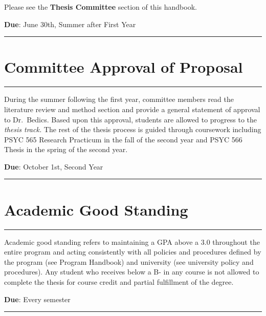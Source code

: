 \documentclass[openany]{book}
\begin{document}
Please see the \textbf{Thesis Committee} section of this handbook.

\textbf{Due}: June 30th, Summer after First Year

\begin{center}\rule{0.5\linewidth}{0.5pt}\end{center}

\hypertarget{committee-approval-of-proposal}{%
\section{Committee Approval of Proposal}\label{committee-approval-of-proposal}}

\begin{center}\rule{0.5\linewidth}{0.5pt}\end{center}

During the summer following the first year, committee members read the literature review and method section and provide a general statement of approval to Dr.~Bedics. Based upon this approval, students are allowed to progress to the \emph{thesis track.} The rest of the thesis process is guided through coursework including PSYC 565 Research Practicum in the fall of the second year and PSYC 566 Thesis in the spring of the second year.

\textbf{Due}: October 1st, Second Year

\begin{center}\rule{0.5\linewidth}{0.5pt}\end{center}

\hypertarget{academic-good-standing}{%
\section{Academic Good Standing}\label{academic-good-standing}}

\begin{center}\rule{0.5\linewidth}{0.5pt}\end{center}

Academic good standing refers to maintaining a GPA above a 3.0 throughout the entire program and acting consistently with all policies and procedures defined by the program (see Program Handbook) and university (see university policy and procedures). Any student who receives below a B- in any course is not allowed to complete the thesis for course credit and partial fulfillment of the degree.

\textbf{Due}: Every semester

\begin{center}\rule{0.5\linewidth}{0.5pt}\end{center}
\end{document}
